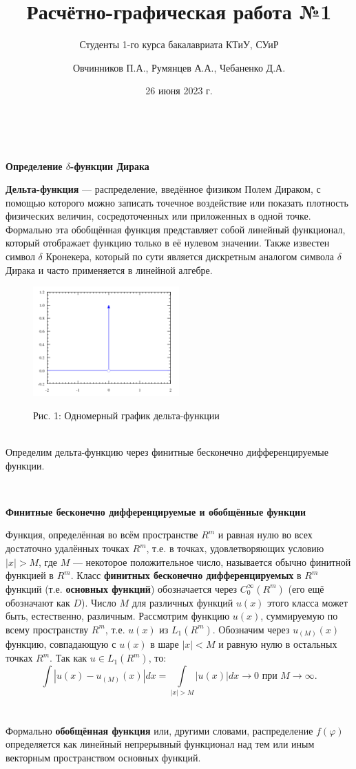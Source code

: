 \documentclass[russian,12pt]{article}
\title{\textbf{Расчётно-графическая работа №1}}
\author{Студенты 1-го курса бакалавриата КТиУ, СУиР \and Овчинников П.А., Румянцев А.А., Чебаненко Д.А.}
\date{26 июня 2023 г.}
\providecommand{\header}[1]{
    \,
    \begin{center}
        {\Large \textbf{#1}}
    \end{center}
    }
\providecommand{\subheader}[1]{
    \,
    \begin{center}
        {\large \textbf{#1}}
    \end{center}
    }
\begin{document}
\maketitle
\header{Определение $\delta$-функции Дирака}
\textbf{Дельта-функция} --- распределение, введённое физиком Полем Дираком, с помощью которого можно записать точечное воздействие или показать плотность физических величин, сосредоточенных или приложенных в одной точке. Формально эта обобщённая функция представляет собой линейный функционал, который отображает функцию только в её нулевом значении. Также известен символ $\delta$ Кронекера, который по сути является дискретным аналогом символа $\delta$ Дирака и часто применяется в линейной алгебре.
\begin{figure}[!h]
    \centering
    \includegraphics[width=0.5\textwidth]{graph}
    \begin{center}{\footnotesize Рис. 1: Одномерный график дельта-функции}\end{center}
\end{figure} \\
Определим дельта-функцию через финитные бесконечно дифференцируемые функции.
\subheader{Финитные бесконечно дифференцируемые и обобщённые функции}
Функция, определённая во всём пространстве $R^m$ и равная нулю во всех достаточно удалённых точках $R^m$, т.е. в точках, удовлетворяющих условию $\left\lvert x\right\rvert > M$, где $M$ --- некоторое положительное число, называется обычно финитной функцией в $R^m$. Класс \textbf{финитных бесконечно дифференцируемых} в $R^m$ функций (т.е. \textbf{основных функций}) обозначается через $C^{\infty}_0(R^m)$ (его ещё обозначают как $D$). Число $M$ для различных функций $u(x)$ этого класса может быть, естественно, различным. Рассмотрим функцию $u(x)$, суммируемую по всему пространству $R^m$, т.е. $u(x)$ из $L_1(R^m)$. Обозначим через $u_{(M)}(x)$ функцию, совпадающую с $u(x)$ в шаре $\left\lvert x\right\rvert < M$ и равную нулю в остальных точках $R^m$. Так как $u \in L_1(R^m)$, то:
$$\int\left\lvert u(x)-u_{(M)}(x)\right\rvert dx = \int\limits_{\left\lvert x\right\rvert > M}\left\lvert u(x)\right\rvert dx \rightarrow 0 \text{ при } M \rightarrow \infty.$$ \\ \, \\
Формально \textbf{обобщённая функция} или, другими словами, распределение $f(\varphi)$ определяется как линейный непрерывный функционал над тем или иным векторным пространством основных функций.
\end{document}

